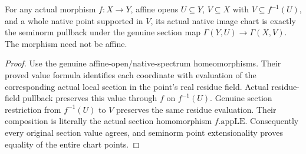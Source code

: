 \begin{lemma}
\label{scheme:actual-affine-appLE-native-square}
\leanok
{}
For any actual morphism $f:X\to Y$, affine opens $U\subseteq Y$,
$V\subseteq X$ with $V\subseteq f^{-1}(U)$, and a whole native point
supported in $V$, its actual native image chart is exactly the
seminorm pullback under the genuine section map
$\Gamma(Y,U)\to\Gamma(X,V)$. The morphism need not be affine.
\end{lemma}
\begin{proof}
Use the genuine affine-open/native-spectrum homeomorphisms. Their
proved value formula identifies each coordinate with evaluation of
the corresponding actual local section in the point's real residue
field. Actual residue-field pullback preserves this value through
$f$ on $f^{-1}(U)$. Genuine section restriction from $f^{-1}(U)$ to
$V$ preserves the same residue evaluation. Their composition is
literally the actual section homomorphism $f.\mathrm{appLE}$.
Consequently every original section value agrees, and seminorm point
extensionality proves equality of the entire chart points.
\end{proof}

